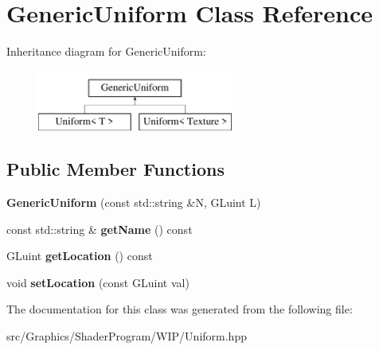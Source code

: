 \hypertarget{class_generic_uniform}{\section{Generic\+Uniform Class Reference}
\label{class_generic_uniform}
}
Inheritance diagram for Generic\+Uniform\+:\begin{figure}[H]
\begin{center}
\leavevmode
\includegraphics[height=2.000000cm]{class_generic_uniform}
\end{center}
\end{figure}
\subsection*{Public Member Functions}
\begin{DoxyCompactItemize}
\item 
\hypertarget{class_generic_uniform_a0779c308a727477f24e384c49184ab21}{{\bfseries Generic\+Uniform} (const std\+::string \&N, G\+Luint L)}\label{class_generic_uniform_a0779c308a727477f24e384c49184ab21}

\item 
\hypertarget{class_generic_uniform_a86859a4955ece317e6ed9a72383b71f7}{const std\+::string \& {\bfseries get\+Name} () const }\label{class_generic_uniform_a86859a4955ece317e6ed9a72383b71f7}

\item 
\hypertarget{class_generic_uniform_aecd6e3593e457da2904091520309c8c8}{G\+Luint {\bfseries get\+Location} () const }\label{class_generic_uniform_aecd6e3593e457da2904091520309c8c8}

\item 
\hypertarget{class_generic_uniform_a7059915d2276ddcc2343b2d88c55ae2a}{void {\bfseries set\+Location} (const G\+Luint val)}\label{class_generic_uniform_a7059915d2276ddcc2343b2d88c55ae2a}

\end{DoxyCompactItemize}


The documentation for this class was generated from the following file\+:\begin{DoxyCompactItemize}
\item 
src/\+Graphics/\+Shader\+Program/\+W\+I\+P/Uniform.\+hpp\end{DoxyCompactItemize}
